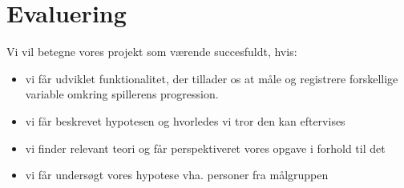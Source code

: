 \documentclass[10pt,a4paper,danish]{article}
\begin{document}
\section{Evaluering}
\label{sec:Evaluering}
Vi vil betegne vores projekt som værende succesfuldt, hvis:

\begin{itemize}
\item vi får udviklet funktionalitet, der tillader os at måle og registrere
forskellige variable omkring spillerens progression.
\item vi får beskrevet hypotesen og hvorledes vi tror den kan eftervises
\item vi finder relevant teori og får perspektiveret vores opgave i forhold
til det
\item vi får undersøgt vores hypotese vha. personer fra målgruppen
\end{itemize}
\end{document}
